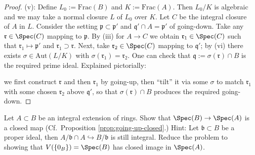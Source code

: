 \begin{proof}
	(v): Define $L_0 := \text{Frac}(B)$ and $K := \text{Frac}(A)$. Then $L_0/K$ is algebraic and we may take a normal closure $L$ of $L_0$ over $K$. Let $C$ be the integral closure of $A$ in $L$. Consider the setting $\mathfrak{p} \subset \mathfrak{p}'$ and $\mathfrak{q}' \cap A = \mathfrak{p}'$ of going-down. Take any $\mathfrak{r} \in \Spec(C)$ mapping to $\mathfrak{p}$. By (iii) for $A \to C$ we obtain $\mathfrak{r}_1 \in \Spec(C)$ such that $\mathfrak{r}_1 \mapsto \mathfrak{p}'$ and $\mathfrak{r}_1 \supset \mathfrak{r}$. Next, take $\mathfrak{r}_2 \in \Spec(C)$ mapping to $\mathfrak{q}'$; by (vi) there exists $\sigma \in \text{Aut}(L/K)$ with $\sigma(\mathfrak{r}_1) = \mathfrak{r}_2$. One can check that $\mathfrak{q} := \sigma(\mathfrak{r}) \cap B$ is the required prime ideal. Explained pictorially:
	\begin{center}\end{center}
	we first construct $\mathfrak{r}$ and then $\mathfrak{r}_1$ by going-up, then ``tilt'' it via some $\sigma$ to match $\mathfrak{r}_1$ with some chosen $\mathfrak{r}_2$ above $\mathfrak{q}'$, so that $\sigma(\mathfrak{r}) \cap B$ produces the required going-down.
\end{proof}

\begin{exercise}\label{exo:integral-closed}
	Let $A \subset B$ be an integral extension of rings. Show that $\Spec(B) \to \Spec(A)$ is a closed map (Cf.\ Proposition \ref{prop:going-up-closed}.) Hint: Let $\mathfrak{b} \subset B$ be a proper ideal, then $A/\mathfrak{b} \cap A \hookrightarrow B/\mathfrak{b}$ is still integral. Reduce the problem to showing that $V(\{0_B\}) = \Spec(B)$ has closed image in $\Spec(A)$.
\end{exercise}


